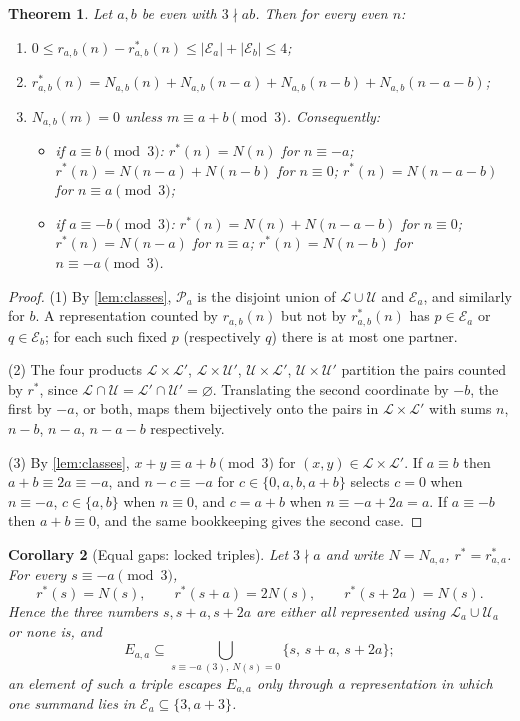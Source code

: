 \documentclass[11pt]{amsart}
\newtheorem{theorem}{Theorem}[section]
\newtheorem{corollary}[theorem]{Corollary}
\theoremstyle{definition}
\theoremstyle{remark}
\newcommand{\PP}{\mathcal{P}}
\newcommand{\Ls}{\mathcal{L}}
\newcommand{\Us}{\mathcal{U}}
\newcommand{\Es}{\mathcal{E}}
\begin{document}
\begin{theorem}\label{thm:decomposition}
Let $a,b$ be even with $3\nmid ab$. Then for every even $n$:
\begin{enumerate}
\item $0\le r_{a,b}(n)-r^*_{a,b}(n)\le |\Es_a|+|\Es_b|\le 4$;
\item $r^*_{a,b}(n)=N_{a,b}(n)+N_{a,b}(n-a)+N_{a,b}(n-b)+N_{a,b}(n-a-b)$;
\item $N_{a,b}(m)=0$ unless $m\equiv a+b\pmod 3$. Consequently:
\begin{itemize}
\item if $a\equiv b\pmod 3$: $r^*(n)=N(n)$ for $n\equiv -a$; $r^*(n)=N(n-a)+N(n-b)$ for $n\equiv 0$; $r^*(n)=N(n-a-b)$ for $n\equiv a\pmod 3$;
\item if $a\equiv -b\pmod 3$: $r^*(n)=N(n)+N(n-a-b)$ for $n\equiv 0$; $r^*(n)=N(n-a)$ for $n\equiv a$; $r^*(n)=N(n-b)$ for $n\equiv -a\pmod 3$.
\end{itemize}
\end{enumerate}
\end{theorem}

\begin{proof}
(1) By \cref{lem:classes}, $\PP_a$ is the disjoint union of $\Ls\cup\Us$ and $\Es_a$, and similarly for $b$. A representation counted by $r_{a,b}(n)$ but not by $r^*_{a,b}(n)$ has $p\in\Es_a$ or $q\in\Es_b$; for each such fixed $p$ (respectively $q$) there is at most one partner.

(2) The four products $\Ls\times\Ls'$, $\Ls\times\Us'$, $\Us\times\Ls'$, $\Us\times\Us'$ partition the pairs counted by $r^*$, since $\Ls\cap\Us=\Ls'\cap\Us'=\varnothing$. Translating the second coordinate by $-b$, the first by $-a$, or both, maps them bijectively onto the pairs in $\Ls\times\Ls'$ with sums $n$, $n-b$, $n-a$, $n-a-b$ respectively.

(3) By \cref{lem:classes}, $x+y\equiv a+b\pmod 3$ for $(x,y)\in\Ls\times\Ls'$. If $a\equiv b$ then $a+b\equiv 2a\equiv -a$, and $n-c\equiv -a$ for $c\in\{0,a,b,a+b\}$ selects $c=0$ when $n\equiv -a$, $c\in\{a,b\}$ when $n\equiv 0$, and $c=a+b$ when $n\equiv -a+2a=a$. If $a\equiv -b$ then $a+b\equiv 0$, and the same bookkeeping gives the second case.
\end{proof}

\begin{corollary}[Equal gaps: locked triples]\label{cor:triples}
Let $3\nmid a$ and write $N=N_{a,a}$, $r^*=r^*_{a,a}$. For every $s\equiv -a\pmod 3$,
\[
r^*(s)=N(s),\qquad r^*(s+a)=2N(s),\qquad r^*(s+2a)=N(s).
\]
Hence the three numbers $s,s+a,s+2a$ are either all represented using $\Ls_a\cup\Us_a$ or none is, and
\[
E_{a,a}\subseteq\bigcup_{s\equiv -a\ (3),\ N(s)=0}\{s,\,s+a,\,s+2a\};
\]
an element of such a triple escapes $E_{a,a}$ only through a representation in which one summand lies in $\Es_a\subseteq\{3,a+3\}$.
\end{corollary}
\end{document}
